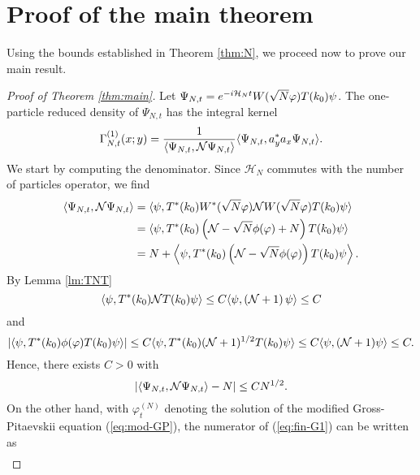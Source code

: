 \documentclass[11pt,a4paper]{article}
\newcommand{\cH}{{\cal H}}
\newcommand{\cN}{{\cal N}}
\newcommand{\Hcal}{\mathcal{H}}		%
\begin{document}
\section{Proof of the main theorem}

Using the bounds established in Theorem \ref{thm:N}, we proceed now to prove our main result.

\begin{proof}[Proof of Theorem \ref{thm:main}]
Let $\Psi_{N,t} = e^{-i\cH_N t} W(\sqrt{N} \varphi) T(k_0) \psi$. The one-particle reduced density of $\Psi_{N,t}$ has the integral kernel
\begin{equation}\label{eq:fin-G1} \Gamma_{N,t}^{(1)} (x;y) = \frac{1}{\langle \Psi_{N,t} , \cN \Psi_{N,t} \rangle} \langle \Psi_{N,t} , a_y^* a_x \Psi_{N,t} \rangle. \end{equation}
We start by computing the denominator. Since $\Hcal_N$ commutes with the number of particles operator, we find
\[ \begin{split} 
\langle \Psi_{N,t} , \cN \Psi_{N,t} \rangle = \; &\langle \psi,T^* (k_0) W^*
(\sqrt{N} \varphi) \cN W (\sqrt{N} \varphi)  T(k_0) \psi\rangle  \\ = \;
&\langle \psi, T^* (k_0) \left( \cN - \sqrt{N} \phi (\varphi) + N \right)
T(k_0) \psi \rangle \\ = \; &N + \left\langle \psi,  T^* (k_0) \left(\cN -
\sqrt{N} \phi(\varphi) \right) T(k_0) \psi \right\rangle. \end{split} \]
By Lemma \ref{lm:TNT}
\[  \langle \psi , T^* (k_0) \cN T(k_0) \psi \rangle \leq C \langle \psi , (\cN+1) \, \psi \rangle \leq C \]
and 
\[ \left| \langle \psi , T^*(k_0) \phi (\varphi) T(k_0) \psi \rangle \right| \leq C \langle \psi, T^* (k_0) (\cN+1)^{1/2} T(k_0) \psi \rangle \leq C \langle \psi , (\cN+1) \psi \rangle \leq C. \]
Hence, there exists $C>0$ with
\begin{equation}\label{eq:fin-G2} \left| \langle \Psi_{N,t} , \cN \Psi_{N,t} \rangle - N \right| \leq C N^{1/2}. \end{equation}
On the other hand, with $\varphi^{(N)}_t$ denoting the solution of the modified Gross-Pitaevskii equation (\ref{eq:mod-GP}), the numerator of (\ref{eq:fin-G1}) can be written as  
\[ \begin{split} 

\end{split}\]
\end{proof}
\end{document}
